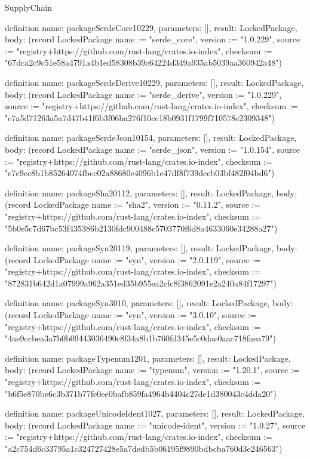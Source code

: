 \begin{lexlean}{SupplyChain}
\begin{semanticmodule}
definition{
  name: packageSerdeCore10229,
  parameters: [],
  result: LockedPackage,
  body: (record LockedPackage {name := "serde_core", version := "1.0.229", source := "registry+https://github.com/rust-lang/crates.io-index", checksum := "67dca2c9c51e58a4791a4b1ed58308b39c64224d349a935ab5039aa360942a48"})
}

definition{
  name: packageSerdeDerive10229,
  parameters: [],
  result: LockedPackage,
  body: (record LockedPackage {name := "serde_derive", version := "1.0.229", source := "registry+https://github.com/rust-lang/crates.io-index", checksum := "e7a5d71263a5a7d47b41f6b3f06ba276f10cc18b0931f1799f710578e2309348"})
}

definition{
  name: packageSerdeJson10154,
  parameters: [],
  result: LockedPackage,
  body: (record LockedPackage {name := "serde_json", version := "1.0.154", source := "registry+https://github.com/rust-lang/crates.io-index", checksum := "e7e9cc8b1b85264074fbcc02a88680c4096b1e47df8f739dceb03bf482f04bd6"})
}

definition{
  name: packageSha20112,
  parameters: [],
  result: LockedPackage,
  body: (record LockedPackage {name := "sha2", version := "0.11.2", source := "registry+https://github.com/rust-lang/crates.io-index", checksum := "5b0e5c7d67bc53f435386b2130fdc900488c5703770f6d8a4633060e34288a27"})
}

definition{
  name: packageSyn20119,
  parameters: [],
  result: LockedPackage,
  body: (record LockedPackage {name := "syn", version := "2.0.119", source := "registry+https://github.com/rust-lang/crates.io-index", checksum := "872831b642d1a07999a962a351ed35b955ea2cfc8f3862091e2a240a84f17297"})
}

definition{
  name: packageSyn3010,
  parameters: [],
  result: LockedPackage,
  body: (record LockedPackage {name := "syn", version := "3.0.10", source := "registry+https://github.com/rust-lang/crates.io-index", checksum := "4ae9ccbea3a7b0b09443036490c8f34a8b1b760fd345e5c0dae0aac718faea79"})
}

definition{
  name: packageTypenum1201,
  parameters: [],
  result: LockedPackage,
  body: (record LockedPackage {name := "typenum", version := "1.20.1", source := "registry+https://github.com/rust-lang/crates.io-index", checksum := "b6f5e870be6c3b371b77fe0ee0bafb859fa4964b4404c27de1d380043c4dda20"})
}

definition{
  name: packageUnicodeIdent1027,
  parameters: [],
  result: LockedPackage,
  body: (record LockedPackage {name := "unicode-ident", version := "1.0.27", source := "registry+https://github.com/rust-lang/crates.io-index", checksum := "a2c754d6c33795a1c324727428e5a7dedb5b06195f9890bdbcba760d3e246563"})
}


\end{semanticmodule}
\end{lexlean}
